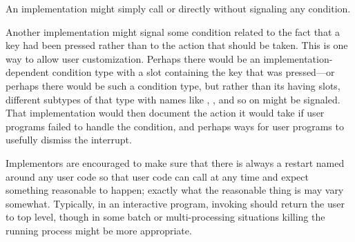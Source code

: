 \begin{defmac}
\begin{sideremark}
    An implementation might simply call  or  directly
    without signaling any condition.

    Another implementation might signal some condition related to
    the fact that a key had been pressed rather than to the action that
    should be taken. This is one way to allow user customization.
    Perhaps there would be an implementation-dependent 
    condition type with a slot containing the key that was pressed---or
    perhaps there would be such a condition type, but rather than its having
    slots, different subtypes of that type with names like ,
    , and so on might be signaled. That implementation would
    then document the action it would take if user programs failed
    to handle the condition, and perhaps ways for user programs to
    usefully dismiss the interrupt.
\end{sideremark}
\betweennoterule
\begin{implementation}
  Implementors are encouraged to make sure that there
  is always a restart named  around any user code so that user code 
  can call  at any time and expect something reasonable to happen;
  exactly what the reasonable thing is may vary somewhat. Typically, in an
  interactive program, invoking  should return the user to top level,
  though in some batch or multi-processing situations
  killing the running process might be
  more appropriate.
\end{implementation}
\afternoterule
\end{defmac}


